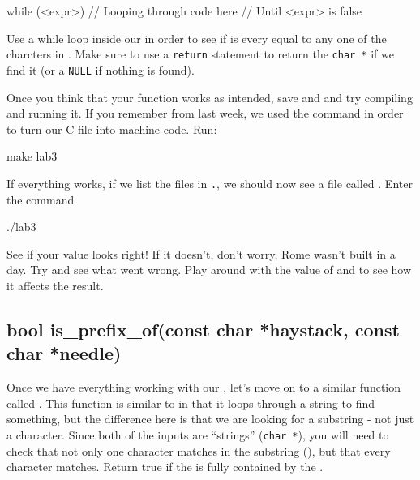 \documentclass{tufte-handout}
\begin{document}
\begin{Code}
    while (<expr>) {
        // Looping through code here
        // Until <expr> is false
    }
\end{Code}

Use a while loop inside our  in order to see if
 is every equal to any one of the charcters in
.
Make sure to use a \texttt{return} statement to return the
\verb!char *! if we find it (or a \texttt{NULL} if nothing is found).

Once you think that your function works as intended, save and and try
compiling and running it. If you
remember from last week, we used the  command in
order to turn our C file into machine code. Run:
\begin{CmdLine*}
  \C make lab3\\
\end{CmdLine*}
If everything works, if we list the files in \texttt{.}, we should now see a file called .  Enter the command
\begin{CmdLine*}
  \C ./lab3\\
\end{CmdLine*}
See if your value looks right!  If it doesn't, don't worry, Rome wasn't built in a day. Try and see what went wrong.  Play around with the value of  and  to see how it affects the result.

\subsection{{bool is\_prefix\_of(const char *haystack,
      const char *needle)}}

Once we have everything working with our , let's
move on to a similar function called
. This
function is similar to  in that it loops through
a string to find something, but the difference here is that we are
looking for a substring - not just a character. Since both of the inputs
are ``strings'' (\verb!char *!), you will need to check that not only one character matches in the substring (), but that every character matches. Return true if the  is fully contained by the .
\end{document}
